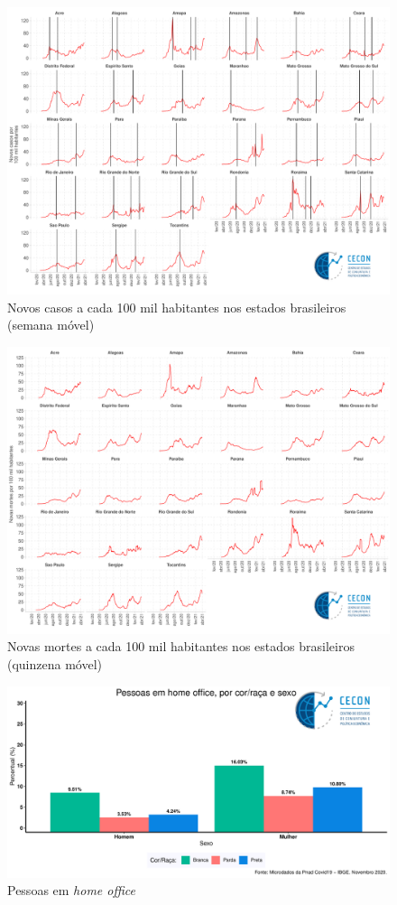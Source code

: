 \documentclass[11pt]{article}
\begin{document}
\begin{figure}[htbp]
\caption{Novos casos a cada 100 mil habitantes nos estados brasileiros (semana móvel)}
\centering
\includegraphics[width=.9\linewidth]{./figs/COVID/Estados/Casos.pdf}
\end{figure}

\begin{figure}[htbp]
\caption{Novas mortes a cada 100 mil habitantes nos estados brasileiros (quinzena móvel)}
\centering
\includegraphics[width=.9\linewidth]{./figs/COVID/Estados/Mortes.pdf}
\end{figure}


\begin{figure}[htbp]
\caption{Pessoas em \emph{home office}}
\centering
\includegraphics[width=.9\linewidth]{./figs/PNAD_COVID/home_sexo_cor.pdf}
\end{figure}
\end{document}
